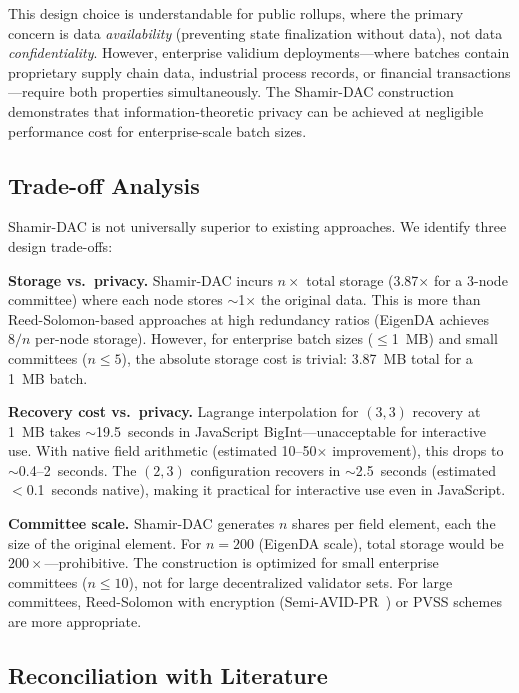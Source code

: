 This design choice is understandable for public rollups, where the primary
concern is data \emph{availability} (preventing state finalization without
data), not data \emph{confidentiality}. However, enterprise validium
deployments---where batches contain proprietary supply chain data, industrial
process records, or financial transactions---require both properties
simultaneously. The Shamir-DAC construction demonstrates that
information-theoretic privacy can be achieved at negligible performance cost
for enterprise-scale batch sizes.

\subsection{Trade-off Analysis}

Shamir-DAC is not universally superior to existing approaches. We identify
three design trade-offs:

\textbf{Storage vs.\ privacy.} Shamir-DAC incurs $n\times$ total storage
(3.87$\times$ for a 3-node committee) where each node stores $\sim$1$\times$
the original data. This is more than Reed-Solomon-based approaches at high
redundancy ratios (EigenDA achieves $8/n$ per-node storage). However, for
enterprise batch sizes ($\leq$1~MB) and small committees ($n \leq 5$), the
absolute storage cost is trivial: 3.87~MB total for a 1~MB batch.

\textbf{Recovery cost vs.\ privacy.} Lagrange interpolation for $(3,3)$
recovery at 1~MB takes $\sim$19.5~seconds in JavaScript BigInt---unacceptable
for interactive use. With native field arithmetic (estimated 10--50$\times$
improvement), this drops to $\sim$0.4--2~seconds. The $(2,3)$ configuration
recovers in $\sim$2.5~seconds (estimated $<$0.1~seconds native), making it
practical for interactive use even in JavaScript.

\textbf{Committee scale.} Shamir-DAC generates $n$ shares per field element,
each the size of the original element. For $n = 200$ (EigenDA scale), total
storage would be $200\times$---prohibitive. The construction is optimized for
small enterprise committees ($n \leq 10$), not for large decentralized
validator sets. For large committees, Reed-Solomon with encryption
(Semi-AVID-PR~\cite{nazirkhanova2022semiavidpr}) or PVSS
schemes~\cite{gentry2022pvss} are more appropriate.

\subsection{Reconciliation with Literature}


